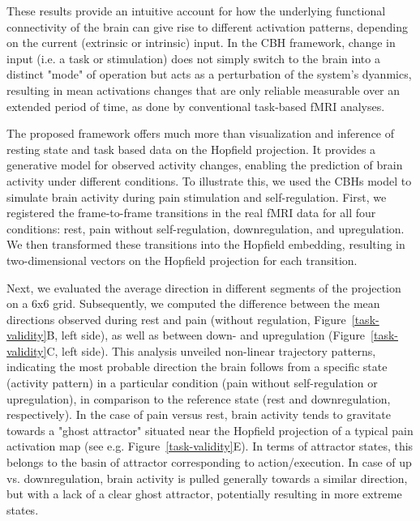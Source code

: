 \documentclass{article}
\begin{document}
These results provide an intuitive account for how the underlying functional connectivity of the brain can give rise to different activation patterns, depending on the current (extrinsic or intrinsic) input.
In the CBH framework, change in input (i.e. a task or stimulation) does not simply switch to the brain into a distinct "mode" of operation but acts as a perturbation of the system's dyanmics, resulting in mean activations changes that are only reliable measurable over an extended period of time, as done by conventional task-based fMRI analyses.

The proposed framework offers much more than visualization and inference of resting state and task based data on the Hopfield projection.
It provides a generative model for observed activity changes, enabling the prediction of brain activity under different conditions.
To illustrate this, we used the CBHs model to simulate brain activity during pain stimulation and self-regulation.
First, we registered the frame-to-frame transitions in the real fMRI data for all four conditions: rest, pain without self-regulation, downregulation, and upregulation. We then transformed these transitions into the Hopfield embedding, resulting in two-dimensional vectors on the Hopfield projection for each transition.

Next, we evaluated the average direction in different segments of the projection on a 6x6 grid. Subsequently, we computed the difference between the mean directions observed during rest and pain (without regulation, Figure~\ref{task-validity}B, left side), as well as between down- and upregulation (Figure~\ref{task-validity}C, left side).
This analysis unveiled non-linear trajectory patterns, indicating the most probable direction the brain follows from a specific state (activity pattern) in a particular condition (pain without self-regulation or upregulation), in comparison to the reference state (rest and downregulation, respectively).
In the case of pain versus rest, brain activity tends to gravitate towards a "ghost attractor" situated near the Hopfield projection of a typical pain activation map (see e.g. Figure~\ref{task-validity}E). In terms of attractor states, this belongs to the basin of attractor corresponding to action/execution. In case of up vs. downregulation, brain activity is pulled generally towards a similar direction, but with a lack of a clear ghost attractor, potentially resulting in more extreme states.
\end{document}
